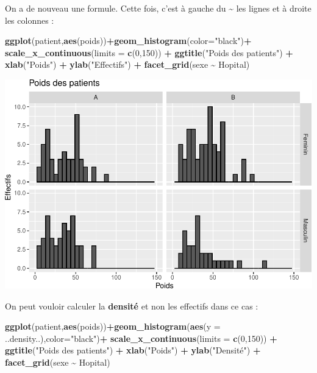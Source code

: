 \documentclass[
]{book}
\newenvironment{Shaded}{\begin{snugshade}}{\end{snugshade}}
\newcommand{\AttributeTok}[1]{\textcolor[rgb]{0.13,0.29,0.53}{#1}}
\newcommand{\DecValTok}[1]{\textcolor[rgb]{0.00,0.00,0.81}{#1}}
\newcommand{\FunctionTok}[1]{\textcolor[rgb]{0.13,0.29,0.53}{\textbf{#1}}}
\newcommand{\NormalTok}[1]{#1}
\newcommand{\SpecialCharTok}[1]{\textcolor[rgb]{0.81,0.36,0.00}{\textbf{#1}}}
\newcommand{\StringTok}[1]{\textcolor[rgb]{0.31,0.60,0.02}{#1}}
\begin{document}
On a de nouveau une formule. Cette fois, c'est à gauche du \textasciitilde{} les lignes et
à droite les colonnes :

\begin{Shaded}
\begin{Highlighting}[]
\FunctionTok{ggplot}\NormalTok{(patient,}\FunctionTok{aes}\NormalTok{(poids))}\SpecialCharTok{+}\FunctionTok{geom\_histogram}\NormalTok{(}\AttributeTok{color=}\StringTok{"black"}\NormalTok{)}\SpecialCharTok{+}
  \FunctionTok{scale\_x\_continuous}\NormalTok{(}\AttributeTok{limits =} \FunctionTok{c}\NormalTok{(}\DecValTok{0}\NormalTok{,}\DecValTok{150}\NormalTok{)) }\SpecialCharTok{+} 
  \FunctionTok{ggtitle}\NormalTok{(}\StringTok{"Poids des patients"}\NormalTok{) }\SpecialCharTok{+} 
  \FunctionTok{xlab}\NormalTok{(}\StringTok{"Poids"}\NormalTok{) }\SpecialCharTok{+} 
  \FunctionTok{ylab}\NormalTok{(}\StringTok{"Effectifs"}\NormalTok{) }\SpecialCharTok{+}
  \FunctionTok{facet\_grid}\NormalTok{(sexe }\SpecialCharTok{\textasciitilde{}}\NormalTok{ Hopital)}
\end{Highlighting}
\end{Shaded}

\includegraphics{_main_files/figure-latex/ggplot10-1.pdf}

On peut vouloir calculer la \textbf{densité} et non les effectifs dans ce cas :

\begin{Shaded}
\begin{Highlighting}[]
\FunctionTok{ggplot}\NormalTok{(patient,}\FunctionTok{aes}\NormalTok{(poids))}\SpecialCharTok{+}\FunctionTok{geom\_histogram}\NormalTok{(}\FunctionTok{aes}\NormalTok{(}\AttributeTok{y =}\NormalTok{ ..density..),}\AttributeTok{color=}\StringTok{"black"}\NormalTok{)}\SpecialCharTok{+}
  \FunctionTok{scale\_x\_continuous}\NormalTok{(}\AttributeTok{limits =} \FunctionTok{c}\NormalTok{(}\DecValTok{0}\NormalTok{,}\DecValTok{150}\NormalTok{)) }\SpecialCharTok{+} 
  \FunctionTok{ggtitle}\NormalTok{(}\StringTok{"Poids des patients"}\NormalTok{) }\SpecialCharTok{+} 
  \FunctionTok{xlab}\NormalTok{(}\StringTok{"Poids"}\NormalTok{) }\SpecialCharTok{+} 
  \FunctionTok{ylab}\NormalTok{(}\StringTok{"Densité"}\NormalTok{) }\SpecialCharTok{+}
  \FunctionTok{facet\_grid}\NormalTok{(sexe }\SpecialCharTok{\textasciitilde{}}\NormalTok{ Hopital)}
\end{Highlighting}
\end{Shaded}
\end{document}
